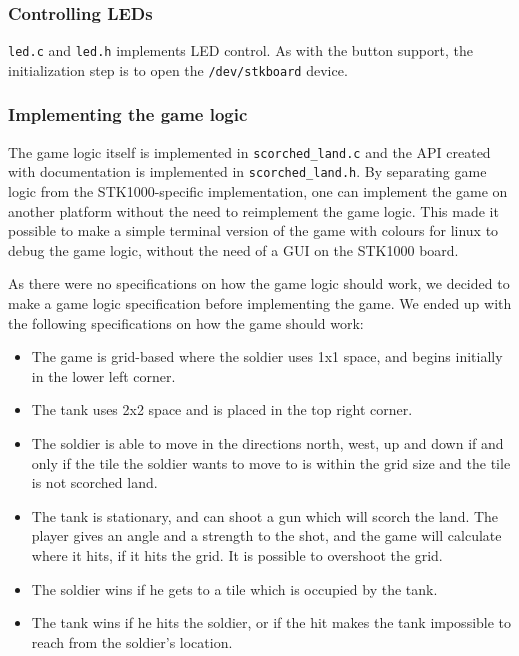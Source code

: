 \subsubsection{Controlling LEDs}

\texttt{led.c} and \texttt{led.h} implements LED control. As with the
button support, the initialization step is to open the
\texttt{/dev/stkboard} device.

\subsubsection{Implementing the game logic}
\label{subsec:game-logic}
The game logic itself is implemented in \texttt{scorched\_land.c} and the
API created with documentation is implemented in
\texttt{scorched\_land.h}. By separating game logic from the
STK1000-specific implementation, one can implement the game on another
platform without the need to reimplement the game logic. This made it
possible to make a simple terminal version of the game with colours for
linux to debug the game logic, without the need of a GUI on the STK1000
board. 

As there were no specifications on how the game logic should work, we
decided to make a game logic specification before implementing the game.
We ended up with the following specifications on how the game should
work:
\begin{itemize}
    \item The game is grid-based where the soldier uses 1x1 space, and
            begins initially in the lower left corner.
    \item The tank uses 2x2 space and is placed in the top right corner.
    \item The soldier is able to move in the directions north, west, up
            and down if and only if the tile the soldier wants to move
            to is within the grid size and the tile is not scorched land.
    \item The tank is stationary, and can shoot a gun which will scorch
            the land. The player gives an angle and a strength to the
            shot, and the game will calculate where it hits, if it hits the grid. It is possible to overshoot the grid.
    \item The soldier wins if he gets to a tile which is
            occupied by the tank.
    \item The tank wins if he hits the soldier, or if the hit makes
            the tank impossible to reach from the soldier's location.
\end{itemize}

